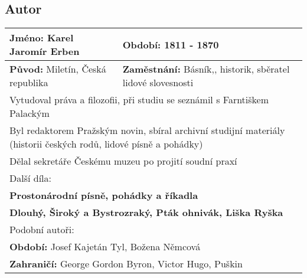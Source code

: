 \subsection*{Autor}
\begin{tabularx}{\linewidth}{l|l}
  \textbf{Jméno:} Karel Jaromír Erben      & \textbf{Období:} 1811 - 1870                                                               \\
  \hline
  \textbf{Původ:} Miletín, Česká republika & \textbf{Zaměstnání:} Básník,, historik, sběratel lidové slovesnosti                        \\
  \hline
  \multicolumn{2}{l}{Vytudoval práva a filozofii, při studiu se seznámil s Farntiškem Palackým}                                         \\
  \multicolumn{2}{l}{Byl redaktorem Pražským novin, sbíral archivní studijní materiály (historii českých rodů, lidové písně a pohádky)} \\
  \multicolumn{2}{l}{Dělal sekretáře Českému muzeu po projití soudní praxí}                                                             \\
  \hline
  \multicolumn{2}{l}{Další díla:}                                                                                                       \\
  \multicolumn{2}{l}{\textbf{Prostonárodní písně, pohádky a říkadla}}                                                                   \\
  \multicolumn{2}{l}{\textbf{Dlouhý, Široký a Bystrozraký, Pták ohnivák, Liška Ryška}}                                                  \\
  \hline
  \multicolumn{2}{l}{Podobní autoři:}                                                                                                   \\
  \multicolumn{2}{l}{\textbf{Období:} Josef Kajetán Tyl, Božena Němcová}                                                                \\
  \multicolumn{2}{l}{\textbf{Zahraničí:} George Gordon Byron, Victor Hugo, Puškin}                                                      \\
\end{tabularx}
